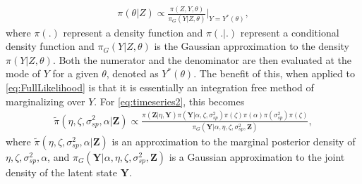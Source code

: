 \documentclass[11pt]{isuthesis}
\begin{document}
	\begin{align}
	\pi(\theta|Z)\propto \frac{ \pi(Z,Y,\theta)}{\pi_G(Y|Z,\theta)}\bigg\rvert_{Y=Y^*(\theta)},
	\end{align}
	where $\pi(.)$ represent a density function and $\pi(.|.)$ represent a conditional density function and $\pi_G(Y|Z,\theta)$ is the Gaussian approximation to the density $\pi(Y|Z,\theta)$. Both the numerator and the denominator are then evaluated at the mode of $Y$ for a given $\theta$, denoted as $Y^*(\theta)$.  The benefit of this, when applied to \eqref{eq:FullLikelihood} is that it is essentially an integration free method of marginalizing over $Y$.  For \eqref{eq:timeseries2}, this becomes
	\begin{align}
	\tilde{\pi}(\eta,\zeta,\sigma_{sp}^2,\alpha|\boldsymbol{Z})\propto \frac{\pi(\boldsymbol{Z}|\eta,\boldsymbol{Y})\pi(\boldsymbol{Y}|\alpha,\zeta,\sigma_{sp}^2)\pi(\zeta)\pi(\alpha)\pi(\sigma_{sp}^2)\pi(\zeta)}{\pi_G(\boldsymbol{Y}|\alpha,\eta,\zeta,\sigma_{sp}^2,\boldsymbol{Z})} \label{eq:INLA},
	\end{align}
	where $\tilde{\pi}(\eta,\zeta,\sigma_{sp}^2,\alpha|\boldsymbol{Z})$ is an approximation to the marginal posterior density of $\eta,\zeta,\sigma_{sp}^2,\alpha$, and $\pi_G(\boldsymbol{Y}|\alpha,\eta,\zeta,\sigma_{sp}^2,\boldsymbol{Z})$ is a Gaussian approximation to the joint density of the latent state $\boldsymbol{Y}$. 
	
\end{document}
